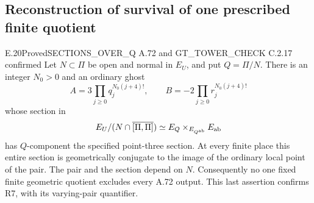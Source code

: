 \subsection{Reconstruction of survival of one prescribed finite quotient}

\begin{result}{E.20}{Proved}{SECTIONS\_OVER\_Q A.72 and GT\_TOWER\_CHECK C.2.17 confirmed}
Let \(N\subset\Pi\) be open and normal in \(E_U\), and put
\(Q=\Pi/N\). There is an integer \(N_0>0\) and an ordinary ghost
\[
 A=3\prod_{j\ge0}q_j^{N_0(j+4)!},\qquad
 B=-2\prod_{j\ge0}r_j^{N_0(j+4)!}
\]
whose section in
\[
 E_U/(N\cap\overline{[\Pi,\Pi]})
 \simeq E_Q\mathbin{\times}_{E_{Q^{\rm ab}}}E_{\rm ab}
\]
has \(Q\)-component the specified point-three section. At every finite
place this entire section is geometrically conjugate to the image of the
ordinary local point of the pair. The pair and the section depend on \(N\).
Consequently no one fixed finite geometric quotient excludes every A.72
output. This last assertion confirms R7, with its varying-pair quantifier.
\end{result}
